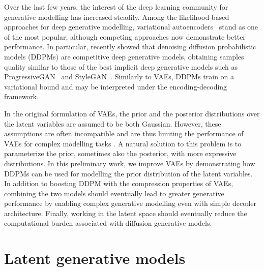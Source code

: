 \documentclass{article}
\begin{document}
Over the last few years, the interest of the deep learning community for generative modelling has increased steadily.
Among the likelihood-based approaches for deep generative modelling, variational autoencoders~\citep[VAEs]{VAEs} stand as one of the most popular, although competing approaches now demonstrate better performance.
In particular, \citet{DDPM,IDDPM,dhariwal2021diffusion} recently showed that denoising diffusion probabilistic models (DDPMs) are competitive deep generative models, obtaining samples quality similar to those of the best implicit deep generative models such as ProgressiveGAN~\citep{PGANs} and StyleGAN~\citep{karras2019style}.
Similarly to VAEs, DDPMs train on a variational bound and may be interpreted under the encoding-decoding framework. 

In the original formulation of VAEs, the prior and the posterior distributions over the latent variables are assumed to be both Gaussian. 
However, these assumptions are often incompatible and are thus limiting the performance of VAEs for complex modelling tasks \citep{vamprior, t_beta_vae}. 
A natural solution to this problem is to parameterize the prior, sometimes also the posterior, with more expressive distributions. In this preliminary work, we improve VAEs by demonstrating how DDPMs can be used for modelling the prior distribution of the latent variables. In addition to boosting DDPM with the compression properties of VAEs, combining the two models should eventually lead to greater generative performance by enabling complex generative modelling even with simple decoder architecture. Finally, working in the latent space should eventually reduce the computational burden associated with diffusion generative models.

\section{Latent generative models}
\end{document}
